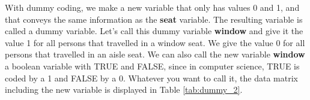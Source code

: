 With dummy coding, we make a new variable that only has values 0 and 1, and that conveys the same information as the \textbf{seat} variable. The resulting variable is called a dummy variable. Let's call this dummy variable \textbf{window} and give it the value 1 for all persons that travelled in a window seat. We give the value 0 for all persons that travelled in an aisle seat. We can also call the new variable \textbf{window} a boolean variable with TRUE and FALSE, since in computer science, TRUE is coded by a 1 and FALSE by a 0. Whatever you want to call it, the data matrix including the new variable is displayed in Table \ref{tab:dummy_2}.

\begin{kframe}


{\ttfamily\noindent\bfseries\color{errorcolor}{\#\# Error in data.frame(person, seat, window, price): object 'price' not found}}

{\ttfamily\noindent\bfseries{}}

{\ttfamily\noindent\bfseries\color{errorcolor}{\#\# Error in eval(predvars, data, env): object 'price' not found}}\end{kframe}





